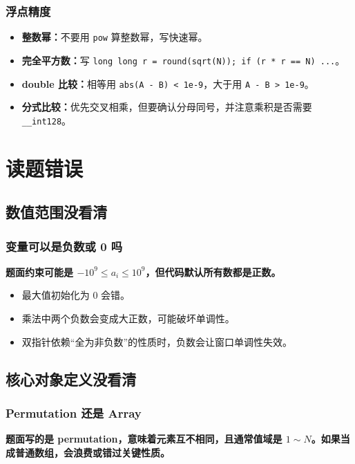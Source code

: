 \documentclass[UTF8,openany,oneside,zihao=-4]{ctexbook}
\newcommand{\risk}[1]{%
  \vspace{0.35em}
  \noindent\colorbox{softred}{%
    \parbox{\dimexpr\linewidth-2\fboxsep}{\textcolor{danger}{\textbf{#1}}}}%
  \vspace{0.35em}
}
\begin{document}
\subsection{浮点精度}

\begin{itemize}
  \item \textbf{整数幂：}不要用 \lstinline!pow! 算整数幂，写快速幂。
  \item \textbf{完全平方数：}写 \lstinline!long long r = round(sqrt(N)); if (r * r == N) ...!。
  \item \textbf{double 比较：}相等用 \lstinline!abs(A - B) < 1e-9!，大于用 \lstinline!A - B > 1e-9!。
  \item \textbf{分式比较：}优先交叉相乘，但要确认分母同号，并注意乘积是否需要 \lstinline!__int128!。
\end{itemize}

\chapter{读题错误}

\section{数值范围没看清}

\subsection{变量可以是负数或 0 吗}

\risk{题面约束可能是 $-10^9 \le a_i \le 10^9$，但代码默认所有数都是正数。}

\begin{itemize}
  \item 最大值初始化为 0 会错。
  \item 乘法中两个负数会变成大正数，可能破坏单调性。
  \item 双指针依赖“全为非负数”的性质时，负数会让窗口单调性失效。
\end{itemize}

\section{核心对象定义没看清}

\subsection{Permutation 还是 Array}

\risk{题面写的是 permutation，意味着元素互不相同，且通常值域是 $1\sim N$。如果当成普通数组，会浪费或错过关键性质。}
\end{document}
